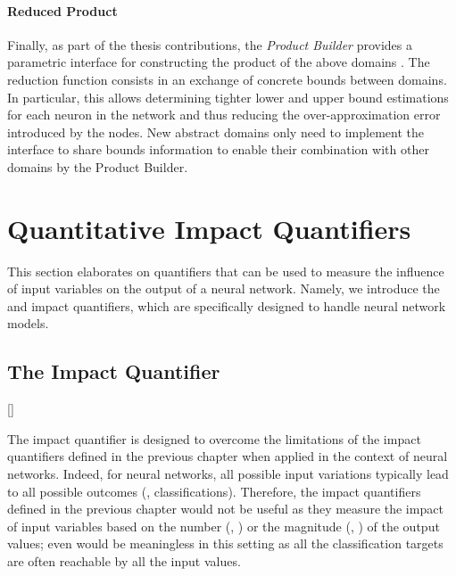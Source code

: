 \paragraph{Reduced Product}

Finally, as part of the thesis contributions, the \emph{Product Builder}  provides a parametric interface for constructing the product of the above domains .
The reduction function consists in an exchange of concrete bounds between domains. In particular, this allows determining tighter lower and upper bound estimations for each neuron in the network and thus reducing the over-approximation error introduced by the \relu{} nodes.
New abstract domains only need to implement the interface to share bounds information to enable their combination with other domains by the Product Builder.



\section{Quantitative Impact Quantifiers}

This section elaborates on quantifiers that can be used to measure the influence of input variables on the output of a neural network.
Namely, we introduce the \changesname{} and \qlibraname{} impact quantifiers, which are specifically designed to handle neural network models.

\subsection{The \changesname{} Impact Quantifier}[\changesname]


The \changesname{} impact quantifier is designed to overcome the limitations of the impact quantifiers defined in the previous chapter when applied in the context of neural networks.
Indeed, for neural networks, all possible input variations typically lead to all possible outcomes (\ie, classifications).
Therefore, the impact quantifiers defined in the previous chapter would not be useful as they measure the impact of input variables based on the number (\eg, \outcomesname{}) or the magnitude (\eg, \rangename{}) of the output values; even \qusedname{} would be meaningless in this setting as all the classification targets are often reachable by all the input values.

